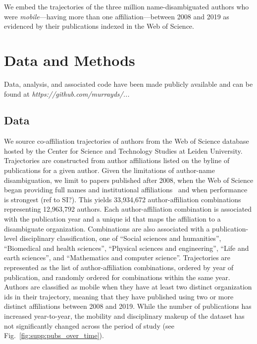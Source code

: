 \documentclass[12pt]{article} %
\begin{document}
We embed the trajectories of the three million name-disambiguated authors who were \textit{mobile}---having more than one affiliation---between 2008 and 2019 as evidenced by their publications indexed in the Web of Science.



%
%
\section{Data and Methods}
\label{sec:datamethods} %

Data, analysis, and associated code have been made publicly available and can be found at \textit{https://github.com/murrayds/...}


\subsection*{Data}
We source co-affiliation trajectories of authors from the Web of Science database hosted by the Center for Science and Technology Studies at Leiden University.
Trajectories are constructed from author affiliations listed on the byline of publications for a given author.
Given the limitations of author-name disambiguation, we limit to papers published after 2008, when the Web of Science began providing full names and institutional affiliations~\autocite{caron2014disambiguation} and when performance is strongest (ref to SI?).
This yields 33,934,672 author-affiliation combinations representing 12,963,792 authors.
Each author-affiliation combination is associated with the publication year and a unique id that maps the affiliation to a disambiguate organization.
Combinations are also associated with a publication-level disciplinary classification, one of ``Social sciences and humanities'',
``Biomedical and health sciences'', ``Physical sciences and engineering'', ``Life and earth sciences'', and ``Mathematics and computer science''.
Trajectories are represented as the list of author-affiliation combinations, ordered by year of publication, and randomly ordered for combinations within the same year.
Authors are classified as mobile when they have at least two distinct organization ids in their trajectory, meaning that they have published using two or more distinct affiliations between 2008 and 2019.
While the number of publications has increased year-to-year, the mobility and disciplinary makeup of the dataset has not significantly changed across the period of study (see Fig.~\ref{fig:supp:pubs_over_time}).
\end{document}
